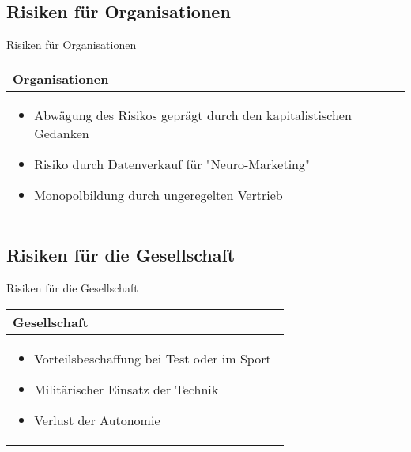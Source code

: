 \documentclass[aspectratio=169,16pt,xcolor=table]{beamer}
\begin{document}
\subsection{Risiken für Organisationen}

\begin{frame}{Risiken für Organisationen}
\centering
\renewcommand{\arraystretch}{1.5} %
\begin{tabular}{|p{12cm}|}
    \hline
    \rowcolor{blue!25}
    \textbf{Organisationen} \\
    \hline
    \begin{itemize}
        \item Abwägung des Risikos geprägt durch den kapitalistischen Gedanken~\cite{khan_aziz_2019}
        \item Risiko durch Datenverkauf für "Neuro-Marketing"~\cite{khan_aziz_2019}
        \item Monopolbildung durch ungeregelten Vertrieb
    \end{itemize} \\
    \hline
\end{tabular}

\end{frame}

\subsection{Risiken für die Gesellschaft}
\begin{frame}{Risiken für die Gesellschaft}
\centering
\renewcommand{\arraystretch}{1.5} %
\begin{tabular}{|p{12cm}|}
    \hline
    \rowcolor{blue!25}
    \textbf{Gesellschaft} \\
    \hline
    \begin{itemize}
        \item Vorteilsbeschaffung bei Test oder im Sport~\cite{khan_aziz_2019}
        \item Militärischer Einsatz der Technik
        \item Verlust der Autonomie~\cite{khan_aziz_2019}
    \end{itemize} \\
    \hline
\end{tabular}

\end{frame}

\end{document}

